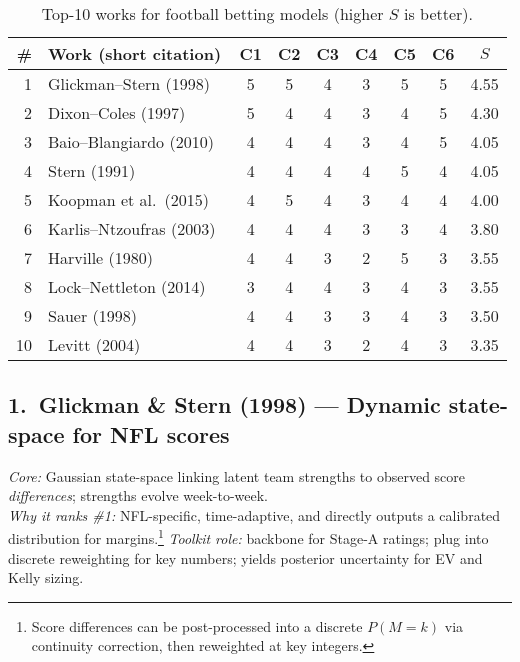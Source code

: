 \documentclass[11pt]{amsart}
\begin{document}
\begin{table}[h]
\centering
\begin{threeparttable}
\caption{Top-10 works for football betting models (higher $S$ is better).}
\label{tab:ranking}
\begin{tabular}{@{}rlccccccc@{}}
\toprule
\# & Work (short citation) & C1 & C2 & C3 & C4 & C5 & C6 & $S$ \\
\midrule
1 & Glickman--Stern (1998)~\cite{GlickmanStern1998} & 5 & 5 & 4 & 3 & 5 & 5 & 4.55 \\
2 & Dixon--Coles (1997)~\cite{DixonColes1997}       & 5 & 4 & 4 & 3 & 4 & 5 & 4.30 \\
3 & Baio--Blangiardo (2010)~\cite{BaioBlangiardo2010}& 4 & 4 & 4 & 3 & 4 & 5 & 4.05 \\
4 & Stern (1991)~\cite{Stern1991}                    & 4 & 4 & 4 & 4 & 5 & 4 & 4.05 \\
5 & Koopman et al.\ (2015)~\cite{Koopman2015}        & 4 & 5 & 4 & 3 & 4 & 4 & 4.00 \\
6 & Karlis--Ntzoufras (2003)~\cite{KarlisNtzoufras2003}& 4 & 4 & 4 & 3 & 3 & 4 & 3.80 \\
7 & Harville (1980)~\cite{Harville1980}              & 4 & 4 & 3 & 2 & 5 & 3 & 3.55 \\
8 & Lock--Nettleton (2014)~\cite{LockNettleton2014}  & 3 & 4 & 4 & 3 & 4 & 3 & 3.55 \\
9 & Sauer (1998)~\cite{Sauer1998}                     & 4 & 4 & 3 & 3 & 4 & 3 & 3.50 \\
10 & Levitt (2004)~\cite{Levitt2004}                  & 4 & 4 & 3 & 2 & 4 & 3 & 3.35 \\
\bottomrule
\end{tabular}
\end{threeparttable}
\end{table}

\subsection*{1.\ Glickman \& Stern (1998) \cite{GlickmanStern1998} --- Dynamic state-space for NFL scores}
\emph{Core:} Gaussian state-space linking latent team strengths to observed score \emph{differences}; strengths evolve week-to-week. \\
\emph{Why it ranks \#1:} NFL-specific, time-adaptive, and directly outputs a calibrated distribution for margins.\footnote{Score differences can be post-processed into a discrete $P(M=k)$ via continuity correction, then reweighted at key integers.} \emph{Toolkit role:} backbone for Stage-A ratings; plug into discrete reweighting for key numbers; yields posterior uncertainty for EV and Kelly sizing.
\end{document}
